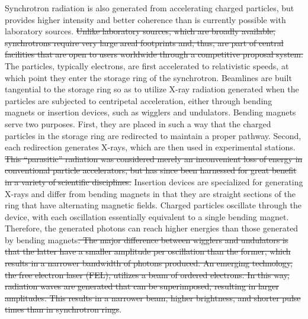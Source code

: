 \documentclass[journal=cmatex,manuscript=perspective]{achemso}
\providecommand{\DIFdeltex}[1]{{\protect\color{red}\sout{#1}}}                      %
\providecommand{\DIFdelbegin}{} %
\providecommand{\DIFdelend}{} %
\providecommand{\DIFdel}[1]{\texorpdfstring{\DIFdeltex{#1}}{}} %
\begin{document}
Synchrotron radiation is also generated from accelerating charged
particles, but provides higher intensity and better coherence than is
currently possible with laboratory sources. \DIFdelbegin \DIFdel{Unlike laboratory sources,
which are broadly available, synchrotrons require very large areal
footprints and, thus, are part of central facilities that are open to
users worldwide through a competitive proposal system. }\DIFdelend The particles,
typically electrons, are first accelerated to relativistic speeds, at
which point they enter the storage ring of the synchrotron. Beamlines
are built tangential to the storage ring so as to utilize X-ray
radiation generated when the particles are subjected to centripetal
acceleration, either through bending magnets or insertion devices,
such as wigglers and undulators. Bending magnets serve two
purposes. First, they are placed in such a way that the charged
particles in the storage ring are redirected to maintain a proper
pathway. Second, each redirection generates X-rays, which are then
used in experimental stations. \DIFdelbegin \DIFdel{This ``parasitic'' radiation was
considered merely an inconvenient loss of energy in conventional
particle accelerators, but has since been harnessed for great benefit
in a variety of scientific disciplines. }\DIFdelend Insertion devices are
specialized for generating X-rays and differ from bending magnets in
that they are straight sections of the ring that have alternating
magnetic fields. Charged particles oscillate through the device, with
each oscillation essentially equivalent to a single bending
magnet. Therefore, the generated photons can reach higher energies
than those generated by bending magnets\DIFdelbegin \DIFdel{. The major difference between
wigglers and undulators is that the latter have a smaller amplitude
per oscillation than the former, which results in a narrower bandwidth
of photons produced. An emerging technology, the free electron laser
(FEL), utilizes a beam of ordered electrons. In this way, radiation
waves are generated that can be superimposed, resulting in larger
amplitudes. This results in a narrower beam, higher brightness, and
shorter pulse times than in synchrotron
rings}\DIFdelend \cite{synchrotronradiation}.
\end{document}
